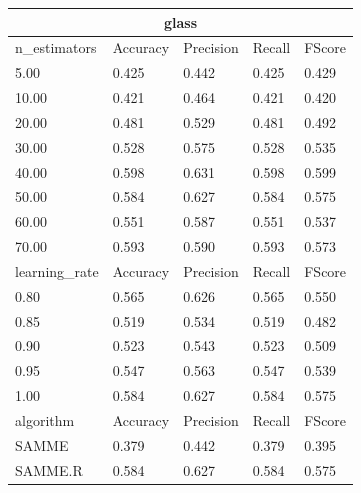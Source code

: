\documentclass[12pt,a4paper]{article}
\begin{document}
\begin{tabular}{ |p{3cm}||p{2cm}|p{2cm}|p{2cm}|p{2cm}| }
\hline
\multicolumn{5}{|c|}{glass}\\
\hline
n\_estimators & Accuracy & Precision & Recall & FScore \\
\hline
5.00 & 0.425 & 0.442 & 0.425 & 0.429\\
10.00 & 0.421 & 0.464 & 0.421 & 0.420\\
20.00 & 0.481 & 0.529 & 0.481 & 0.492\\
30.00 & 0.528 & 0.575 & 0.528 & 0.535\\
40.00 & 0.598 & 0.631 & 0.598 & 0.599\\
50.00 & 0.584 & 0.627 & 0.584 & 0.575\\
60.00 & 0.551 & 0.587 & 0.551 & 0.537\\
70.00 & 0.593 & 0.590 & 0.593 & 0.573\\
\hline
learning\_rate & Accuracy & Precision & Recall & FScore \\
\hline
0.80 & 0.565 & 0.626 & 0.565 & 0.550\\
0.85 & 0.519 & 0.534 & 0.519 & 0.482\\
0.90 & 0.523 & 0.543 & 0.523 & 0.509\\
0.95 & 0.547 & 0.563 & 0.547 & 0.539\\
1.00 & 0.584 & 0.627 & 0.584 & 0.575\\
\hline
algorithm & Accuracy & Precision & Recall & FScore \\
\hline
SAMME & 0.379 & 0.442 & 0.379 & 0.395\\
SAMME.R & 0.584 & 0.627 & 0.584 & 0.575\\
\hline
\end{tabular}
\end{document}
